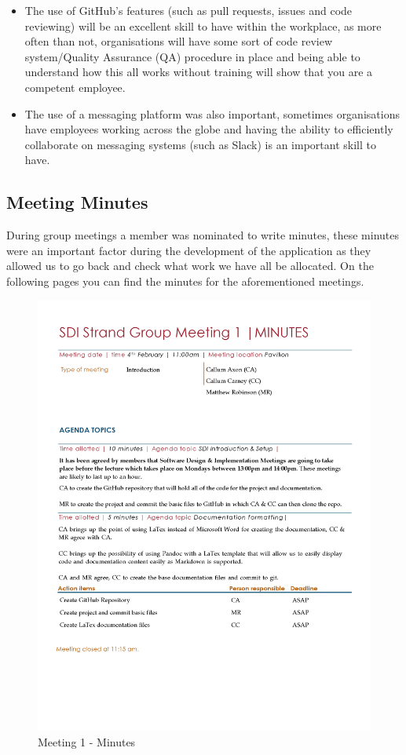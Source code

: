 \documentclass[
  english,
  a4paper,
,tablecaptionabove
]{scrartcl}
\providecommand{\tightlist}{%
  \setlength{\itemsep}{0pt}\setlength{\parskip}{0pt}}
\begin{document}
\begin{itemize}
\tightlist
\item
  The use of GitHub's features (such as pull requests, issues and code
  reviewing) will be an excellent skill to have within the workplace, as
  more often than not, organisations will have some sort of code review
  system/Quality Assurance (QA) procedure in place and being able to
  understand how this all works without training will show that you are
  a competent employee.
\item
  The use of a messaging platform was also important, sometimes
  organisations have employees working across the globe and having the
  ability to efficiently collaborate on messaging systems (such as
  Slack) is an important skill to have.
\end{itemize}

\hypertarget{meeting-minutes}{%
\subsection{Meeting Minutes}\label{meeting-minutes}}

During group meetings a member was nominated to write minutes, these
minutes were an important factor during the development of the
application as they allowed us to go back and check what work we have
all be allocated. On the following pages you can find the minutes for
the aforementioned meetings.

\begin{figure}
\centering
\includegraphics{images/meeting-minutes/meeting-1.png}
\caption{Meeting 1 - Minutes}
\end{figure}
\end{document}
